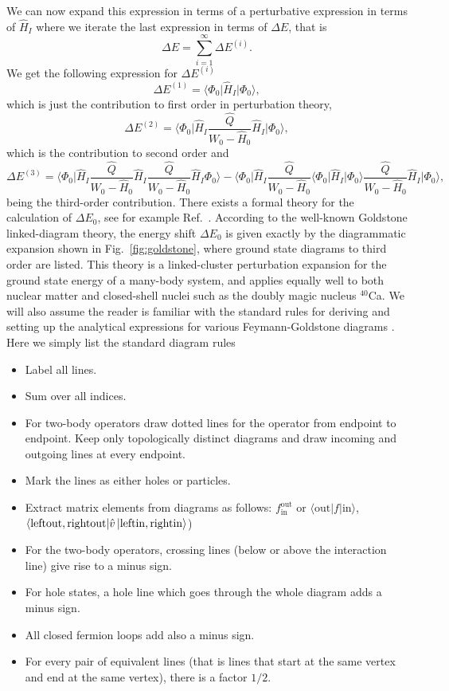  We can now expand this expression in terms of a perturbative expression in
  terms of $\hat{H}_I$ where we iterate the last expression in terms
  of $\Delta E$, that is 
  \[
  \Delta E=\sum_{i=1}^{\infty}\Delta E^{(i)}.
  \]
  We get the following expression for $\Delta E^{(i)}$
  \[
  \Delta E^{(1)}=\langle \Phi_0\vert \hat{H}_I\vert \Phi_0\rangle,
  \] 
  which is just the contribution to first order in perturbation
  theory,
  \[
  \Delta E^{(2)}=\langle\Phi_0\vert
  \hat{H}_I\frac{\hat{Q}}{W_0-\hat{H}_0}\hat{H}_I\vert \Phi_0\rangle,
  \]
  which is the contribution to second order and
  \[
  \Delta E^{(3)}=\langle \Phi_0\vert
  \hat{H}_I\frac{\hat{Q}}{W_0-\hat{H}_0}\hat{H}_I\frac{\hat{Q}}{W_0-\hat{H}_0}\hat{H}_I\Phi_0\rangle-
  \langle\Phi_0\vert \hat{H}_I\frac{\hat{Q}}{W_0-\hat{H}_0}\langle
  \Phi_0\vert \hat{H}_I\vert
  \Phi_0\rangle\frac{\hat{Q}}{W_0-\hat{H}_0}\hat{H}_I\vert
  \Phi_0\rangle,
  \]
  being the third-order contribution.
  There exists a formal theory for the calculation
  of $\Delta E_0$, see for example Ref.~\cite{shavittbartlett2009}.  According to the well-known Goldstone
  linked-diagram theory, the energy shift $\Delta E_0$ is given
  exactly by the diagrammatic expansion shown in
  Fig.~\ref{fig:goldstone}, where ground state diagrams to third order are listed. This theory is a linked-cluster
  perturbation expansion for the ground state energy of a many-body
  system, and applies equally well to both nuclear matter and
  closed-shell nuclei such as the doubly magic nucleus $^{40}$Ca.  
We will also assume the reader is familiar 
with the standard rules for deriving and setting up the analytical expressions for various Feymann-Goldstone diagrams \cite{svavittbartlett2009}.
Here we simply list the standard diagram rules
 \begin{itemize}
        \item Label all lines.
        \item Sum over all indices. 
        \item For two-body operators draw dotted lines for the operator from endpoint to endpoint. 
Keep only topologically distinct diagrams and draw incoming and outgoing lines at every endpoint.
\item Mark the lines as either holes or particles. 
        \item Extract matrix elements from diagrams as follows: $f_{\mathrm{in}}^{\mathrm{out}}$ or 
$\langle \mathrm{out}|f|\mathrm{in}\rangle$, 
            $\langle \mathrm{leftout, rightout}|\hat{v}\,|{\mathrm{leftin, rightin}}\rangle$)
\item For the two-body operators, crossing lines (below or above the interaction line) 
give rise to a minus sign.
\item For hole states, a hole line which goes through the whole diagram adds a minus sign.  
\item All closed fermion loops add also a minus sign.
\item For every pair of equivalent lines (that is lines that start at the same vertex and end at the same vertex), there is  a factor $1/2$.
    \end{itemize}

